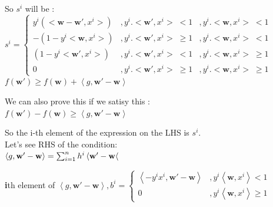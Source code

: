 \documentclass[a4paper,11pt]{article}
\begin{document}
\begin{mlsolution}
So \begin{math}s^{i}\end{math} will be :\\

\begin{math}
s^{i} = \left\{\begin{matrix}
y^{i} \left (<\textbf{w} -\textbf{w}{}', x^{i}>\right ) & ,y^{i}.<\textbf{w}{}', x^{i}> \; <  1&,  y^{i}.<\textbf{w}, x^{i}> \;< 1\\ 
- \left ( 1 - y^{i}<\textbf{w}, x^{i}> \right ) & ,y^{i}.<\textbf{w}{}', x^{i}> \; \geq  1 & ,  y^{i}.<\textbf{w}, x^{i}> \;< 1\\ 
\left ( 1 - y^{i}<\textbf{w}{}', x^{i}>  \right ) & ,y^{i}.<\textbf{w}{}', x^{i}> \; <  1 & ,  y^{i}.<\textbf{w}, x^{i}> \; \geq 1\\ 
0 & ,y^{i}.<\textbf{w}{}', x^{i}> \; \geq  1 & ,  y^{i}.<\textbf{w}, x^{i}> \; \geq 1
\end{matrix}\right.
\end{math}\\

\begin{math}
f\left ( \textbf{w}{}' \right ) \geq f\left ( \textbf{w} \right ) + \left \langle g, \textbf{w}{}' - \textbf{w} \right \rangle
\end{math}

We can also prove this if we satisy this : \\

\begin{math}
f\left ( \textbf{w}{}' \right ) - f\left ( \textbf{w} \right ) \geq  \left \langle g, \textbf{w}{}' - \textbf{w} \right \rangle
\end{math}

So the i-th element of the expression on the LHS is \begin{math}
s^{i}.\end{math}\\

Let's see RHS of the condition:\\

\begin{math}\left \langle g, \textbf{w}{}' - \textbf{w} \right \rangle = \sum_{i=1}^{n} h^{i}\left \langle \textbf{w}{}' - \textbf{w} \right \langle \\
\end{math}

\textbf{i}th element of \begin{math}
\left \langle g, \textbf{w}{}' - \textbf{w} \right \rangle, b^{i} = \left\{\begin{matrix}
\left \langle -y^{i}x^{i}, \textbf{w}{}' - \textbf{w} \right \rangle & ,y^{i}\left \langle \textbf{w}, x^{i} \right \rangle < 1\\ 
0 & ,y^{i}\left \langle \textbf{w}, x^{i} \right \rangle \geq 1
\end{matrix}\right.
\end{math}\\\\


\end{mlsolution}
\end{document}
